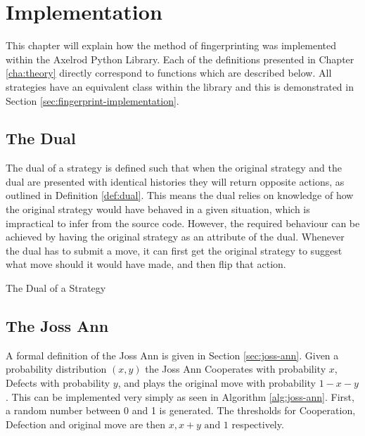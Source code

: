 
\chapter{Implementation}\label{cha:implementation}

This chapter will explain how the method of fingerprinting was implemented within the Axelrod Python Library.
Each of the definitions presented in Chapter \ref{cha:theory} directly correspond to functions which are described below.
All strategies have an equivalent class within the library and this is demonstrated in Section \ref{sec:fingerprint-implementation}.

\section{The Dual}
The dual of a strategy is defined such that when the original strategy and the dual are presented with identical histories they will return opposite actions, as outlined in Definition \ref{def:dual}.
This means the dual relies on knowledge of how the original strategy would have behaved in a given situation, which is impractical to infer from the source code.
However, the required behaviour can be achieved by having the original strategy as an attribute of the dual.
Whenever the dual has to submit a move, it can first get the original strategy to suggest what move should it would have made, and then flip that action.

\begin{algorithm}[H]
 \caption{The Dual of a Strategy}
\end{algorithm}

\section{The Joss Ann}

A formal definition of the Joss Ann is given in Section \ref{sec:joss-ann}.
Given a probability distribution $(x, y)$ the Joss Ann Cooperates with probability $x$, Defects with probability $y$, and plays the original move with probability $1 -x-y$.
This can be implemented very simply as seen in Algorithm \ref{alg:joss-ann}.
First, a random number between 0 and 1 is generated.
The thresholds for Cooperation, Defection and original move are then $x, x+y \text{ and } 1$ respectively.

